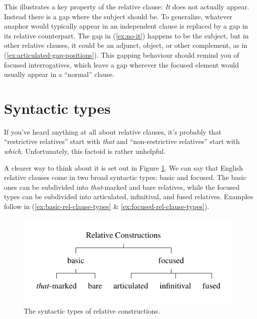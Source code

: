 \label{ex:no-it}
\z

This illustrates a key property of the relative clause: \textit{It} does not actually appear. Instead there is a gap where the subject should be. To generalize, whatever anaphor would typically appear in an independent clause is replaced by a gap in its relative counterpart. The gap in (\ref{ex:no-it}) happens to be the subject, but in other relative clauses, it could be an adjunct, object, or other complement, as in (\ref{ex:articulated-gap-positions}). This gapping behaviour should remind you of focused interrogatives, which leave a gap wherever the focused element would usually appear in a ``normal'' clause.

\ea \label{ex:articulated-gap-positions}
    \z
\z

\section{Syntactic types}

If you've heard anything at all about relative clauses, it's probably that ``restrictive relatives'' start with \textit{that} and ``non-restrictive relatives'' start with \textit{which}. Unfortunately, this factoid is rather unhelpful.

A clearer way to think about it is set out in Figure \ref{fig:relative-construction-types}. We can say that English relative clauses come in two broad syntactic types: basic and focused. The basic ones can be subdivided into \textit{that}-marked and bare relatives, while the focused types can be subdivided into articulated, infinitival, and fused relatives. Examples follow in (\ref{ex:basic-rel-clause-types} \& \ref{ex:focused-rel-clause-types}).

\begin{figure}[ht]
    \centering
    \includegraphics{figures/relative-types.pdf}
    \caption{The syntactic types of relative constructions.}
    \label{fig:relative-construction-types}
\end{figure}


